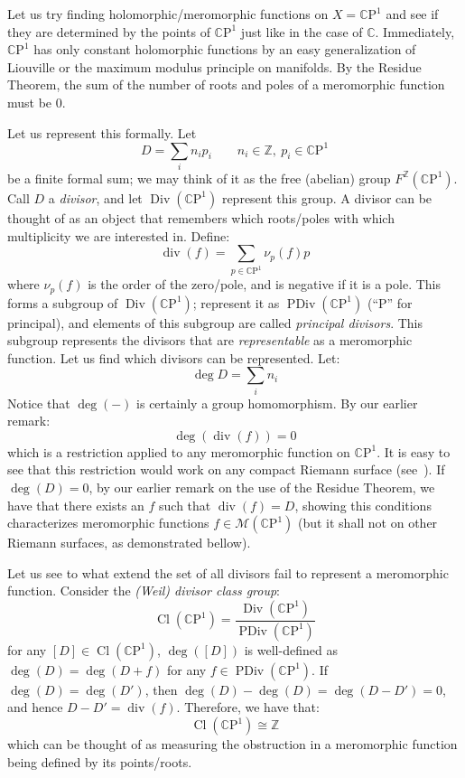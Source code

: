\documentclass{book}
\newcommand{\C}{{\mathbb{C}}}
\newcommand{\Z}{{\mathbb{Z}}}
\newcommand{\CM}{{\mathcal{M}}}
\newcommand{\CP}{\mathbb{C}\mathrm{P}}
\newcommand{\Cl}{{\operatorname{Cl}}}
\renewcommand{\div}{{\operatorname{div}}}
\newcommand{\Div}{{\operatorname{Div}}}
\newcommand{\PDiv}{{\operatorname{PDiv}}}
\begin{document}
Let us try finding holomorphic/meromorphic functions on $X = \CP^1$ and see if they are
determined by the points of $\CP^1$ just like in the case of $\C$. Immediately, $\CP^1$ has only constant holomorphic functions by an easy
generalization of Liouville or the maximum modulus principle on manifolds. By the Residue Theorem, the sum of
the number of roots and poles of a meromorphic function must be $0$.

Let us represent this formally. Let
\[
  D = \sum_i n_ip_i \qquad n_i\in \Z,\ p_i \in \CP^1
\]
be a finite formal sum; we may think of it as the free (abelian) group $F^{\Z}(\CP^1)$. Call $D$
a \emph{divisor}, and let $\Div(\CP^1)$
represent this group. A divisor can be thought of as an object that remembers which roots/poles with which
multiplicity we are interested in. Define:
\[
  \div(f) =  \sum_{p \in \CP^1} \nu_{p}(f)p
\]
where $\nu_{p}(f)$ is the order of the zero/pole, and is negative if it is a pole. This forms a subgroup of
$\Div(\CP^1)$; represent it as $\PDiv(\CP^1)$ (``P'' for principal), and elements of this subgroup are called
\emph{principal divisors}. This subgroup represents the divisors that are \emph{representable} as a
meromorphic function. Let us find which divisors can be represented. Let:
\[
  \deg D = \sum_i n_i
\]
Notice that $\deg(-)$ is certainly a group homomorphism. By our earlier remark:
\[
  \deg(\div(f)) = 0
\]
which is a restriction applied to any meromorphic function on $\CP^1$. It is easy to see that this restriction
would work on any compact Riemann surface (see~\cite[chapter~6]{NateComplexAnalysis}). If $\deg(D) = 0$, by
our earlier remark on the use of the Residue Theorem, we have that there exists an $f$ such that $\div(f) = D$,
showing this conditions characterizes meromorphic functions $f \in \CM(\CP^1)$ (but it shall not on other
Riemann surfaces, as demonstrated bellow).

Let us see to what extend the set of all divisors fail to represent a meromorphic function. Consider the
\emph{(Weil) divisor class group}:
\[
  \Cl(\CP^1) = \frac{\Div(\CP^1)}{\PDiv(\CP^1)}
\]
for any $[D] \in \Cl(\CP^1)$,  $\deg([D])$ is well-defined as $\deg(D) = \deg(D + f)$ for any $f \in
\PDiv(\CP^1)$. If $\deg(D) = \deg(D')$, then $\deg(D) - \deg(D) = \deg(D-D') = 0$, and hence $D-D'
= \div(f)$. Therefore, we have that:
\[
  \Cl(\CP^1) \cong \Z
\]
which can be thought of as measuring the obstruction in a meromorphic function being defined by its
points/roots.
\end{document}

